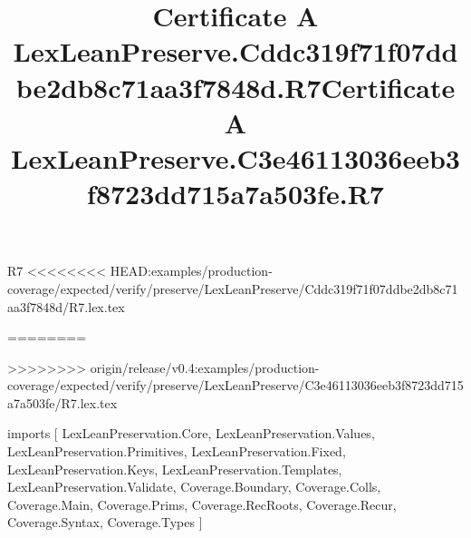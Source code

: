 \begin{lexlean}{R7}
<<<<<<<< HEAD:examples/production-coverage/expected/verify/preserve/LexLeanPreserve/Cddc319f71f07ddbe2db8c71aa3f7848d/R7.lex.tex
\title{Certificate A LexLeanPreserve.Cddc319f71f07ddbe2db8c71aa3f7848d.R7}
========
\title{Certificate A LexLeanPreserve.C3e46113036eeb3f8723dd715a7a503fe.R7}
>>>>>>>> origin/release/v0.4:examples/production-coverage/expected/verify/preserve/LexLeanPreserve/C3e46113036eeb3f8723dd715a7a503fe/R7.lex.tex
\begin{coremodule}
imports [
  LexLeanPreservation.Core,
  LexLeanPreservation.Values,
  LexLeanPreservation.Primitives,
  LexLeanPreservation.Fixed,
  LexLeanPreservation.Keys,
  LexLeanPreservation.Templates,
  LexLeanPreservation.Validate,
  Coverage.Boundary,
  Coverage.Colls,
  Coverage.Main,
  Coverage.Prims,
  Coverage.RecRoots,
  Coverage.Recur,
  Coverage.Syntax,
  Coverage.Types
]


\end{coremodule}
\end{lexlean}
